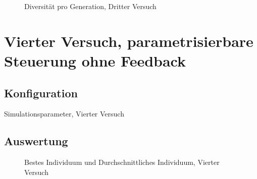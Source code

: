           \begin{figure}
            \centering
            
            \caption{Diversität pro Generation, Dritter Versuch\label{fig:graphDivThird}}
          \end{figure}

      \section{Vierter Versuch, parametrisierbare Steuerung ohne Feedback}

        \subsection{Konfiguration}

          \begin{table}[H]
            \centering
            
            \caption{Simulationsparameter, Vierter Versuch \label{tbl:forthRunConf}}
          \end{table}

        \subsection{Auswertung}

          \begin{figure}
            \centering
            
            \caption{Bestes Individuum und Durchschnittliches Individuum, Vierter Versuch\label{fig:graphFourth}}
          \end{figure}

